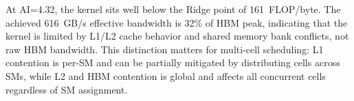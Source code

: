 At AI=4.32, the kernel sits well below the Ridge point of 161~FLOP/byte. The achieved 616~GB/s effective bandwidth is 32\% of HBM peak, indicating that the kernel is limited by L1/L2 cache behavior and shared memory bank conflicts, not raw HBM bandwidth. This distinction matters for multi-cell scheduling: L1 contention is per-SM and can be partially mitigated by distributing cells across SMs, while L2 and HBM contention is global and affects all concurrent cells regardless of SM assignment.
